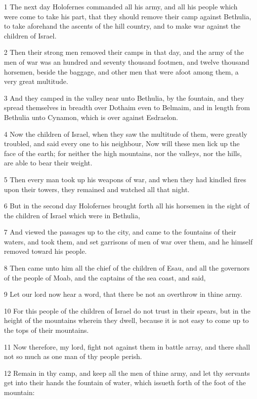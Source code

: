 \par 1 The next day Holofernes commanded all his army, and all his people which were come to take his part, that they should remove their camp against Bethulia, to take aforehand the ascents of the hill country, and to make war against the children of Israel.
\par 2 Then their strong men removed their camps in that day, and the army of the men of war was an hundred and seventy thousand footmen, and twelve thousand horsemen, beside the baggage, and other men that were afoot among them, a very great multitude.
\par 3 And they camped in the valley near unto Bethulia, by the fountain, and they spread themselves in breadth over Dothaim even to Belmaim, and in length from Bethulia unto Cynamon, which is over against Esdraelon.
\par 4 Now the children of Israel, when they saw the multitude of them, were greatly troubled, and said every one to his neighbour, Now will these men lick up the face of the earth; for neither the high mountains, nor the valleys, nor the hills, are able to bear their weight.
\par 5 Then every man took up his weapons of war, and when they had kindled fires upon their towers, they remained and watched all that night.
\par 6 But in the second day Holofernes brought forth all his horsemen in the sight of the children of Israel which were in Bethulia,
\par 7 And viewed the passages up to the city, and came to the fountains of their waters, and took them, and set garrisons of men of war over them, and he himself removed toward his people.
\par 8 Then came unto him all the chief of the children of Esau, and all the governors of the people of Moab, and the captains of the sea coast, and said,
\par 9 Let our lord now hear a word, that there be not an overthrow in thine army.
\par 10 For this people of the children of Israel do not trust in their spears, but in the height of the mountains wherein they dwell, because it is not easy to come up to the tops of their mountains.
\par 11 Now therefore, my lord, fight not against them in battle array, and there shall not so much as one man of thy people perish.
\par 12 Remain in thy camp, and keep all the men of thine army, and let thy servants get into their hands the fountain of water, which issueth forth of the foot of the mountain:
